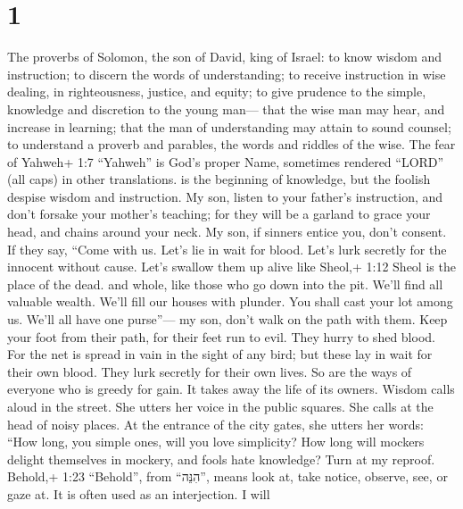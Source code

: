 \hypertarget{section}{%
\section{1}\label{section}}

 The proverbs of Solomon, the son of David, king of Israel:
 to know wisdom and instruction; to discern the words of
understanding;  to receive instruction in wise dealing, in
righteousness, justice, and equity;  to give prudence to the
simple, knowledge and discretion to the young man---  that
the wise man may hear, and increase in learning; that the man of
understanding may attain to sound counsel;  to understand a
proverb and parables, the words and riddles of the wise. 
The fear of Yahweh+ 1:7 ``Yahweh'' is God's proper Name, sometimes
rendered ``LORD'' (all caps) in other translations. is the beginning of
knowledge, but the foolish despise wisdom and instruction. 
My son, listen to your father's instruction, and don't forsake your
mother's teaching;  for they will be a garland to grace your
head, and chains around your neck.  My son, if sinners
entice you, don't consent.  If they say, ``Come with us.
Let's lie in wait for blood. Let's lurk secretly for the innocent
without cause.  Let's swallow them up alive like Sheol,+
1:12 Sheol is the place of the dead. and whole, like those who go down
into the pit.  We'll find all valuable wealth. We'll fill
our houses with plunder.  You shall cast your lot among us.
We'll all have one purse''---  my son, don't walk on the
path with them. Keep your foot from their path,  for their
feet run to evil. They hurry to shed blood.  For the net is
spread in vain in the sight of any bird;  but these lay in
wait for their own blood. They lurk secretly for their own lives.
 So are the ways of everyone who is greedy for gain. It
takes away the life of its owners.  Wisdom calls aloud in
the street. She utters her voice in the public squares. 
She calls at the head of noisy places. At the entrance of the city
gates, she utters her words:  ``How long, you simple ones,
will you love simplicity? How long will mockers delight themselves in
mockery, and fools hate knowledge?  Turn at my reproof.
Behold,+ 1:23 ``Behold'', from ``הִנֵּה'', means look at, take notice,
observe, see, or gaze at. It is often used as an interjection. I will
